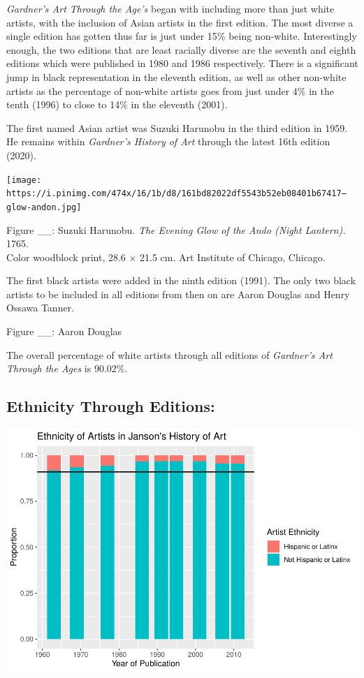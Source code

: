 \documentclass[
  letterpaper,
  DIV=11,
  numbers=noendperiod]{scrreprt}
\begin{document}
\emph{Gardner's Art Through the Age's} began with including more than
just white artists, with the inclusion of Asian artists in the first
edition. The most diverse a single edition has gotten thus far is just
under 15\% being non-white. Interestingly enough, the two editions that
are least racially diverse are the seventh and eighth editions which
were published in 1980 and 1986 respectively. There is a significant
jump in black representation in the eleventh edition, as well as other
non-white artists as the percentage of non-white artists goes from just
under 4\% in the tenth (1996) to close to 14\% in the eleventh (2001).

The first named Asian artist was Suzuki Harunobu in the third edition in
1959. He remains within \emph{Gardner's History of Art} through the
latest 16th edition (2020).

\texttt{[image: https://i.pinimg.com/474x/16/1b/d8/161bd82022df5543b52eb08401b67417--glow-andon.jpg]}

Figure \_\_: Suzuki Harunobu. \emph{The Evening Glow of the Ando (Night
Lantern).} 1765.\\
Color woodblock print, 28.6 × 21.5 cm. Art Institute of Chicago,
Chicago.

The first black artists were added in the ninth edition (1991). The only
two black artists to be included in all editions from then on are Aaron
Douglas and Henry Ossawa Tanner.

Figure \_\_: Aaron Douglas

The overall percentage of white artists through all editions of
\emph{Gardner's Art Through the Ages} is 90.02\%.

\hypertarget{ethnicity-through-editions}{%
\subsection{\texorpdfstring{\textbf{Ethnicity Through
Editions:}}{Ethnicity Through Editions:}}\label{ethnicity-through-editions}}

\includegraphics{Chapter1/Chapter1_files/figure-pdf/jansonethnicitythroughtime-1.pdf}
\end{document}
